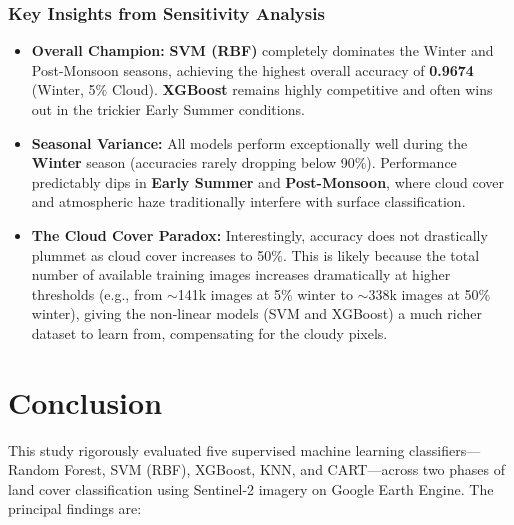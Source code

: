 \documentclass[12pt, a4paper, twocolumn]{article}
\begin{document}
\subsubsection*{Key Insights from Sensitivity Analysis}

\begin{itemize}
    \item \textbf{Overall Champion:} \textbf{SVM (RBF)} completely dominates the Winter and Post-Monsoon seasons, achieving the highest overall accuracy of \textbf{0.9674} (Winter, 5\% Cloud). \textbf{XGBoost} remains highly competitive and often wins out in the trickier Early Summer conditions.
    \item \textbf{Seasonal Variance:} All models perform exceptionally well during the \textbf{Winter} season (accuracies rarely dropping below 90\%). Performance predictably dips in \textbf{Early Summer} and \textbf{Post-Monsoon}, where cloud cover and atmospheric haze traditionally interfere with surface classification.
    \item \textbf{The Cloud Cover Paradox:} Interestingly, accuracy does not drastically plummet as cloud cover increases to 50\%. This is likely because the total number of available training images increases dramatically at higher thresholds (e.g., from $\sim$141k images at 5\% winter to $\sim$338k images at 50\% winter), giving the non-linear models (SVM and XGBoost) a much richer dataset to learn from, compensating for the cloudy pixels.
\end{itemize}

\section{Conclusion}
\label{sec:conclusion}

This study rigorously evaluated five supervised machine learning classifiers---Random Forest, SVM (RBF), XGBoost, KNN, and CART---across two phases of land cover classification using Sentinel-2 imagery on Google Earth Engine.
The principal findings are:
\end{document}
